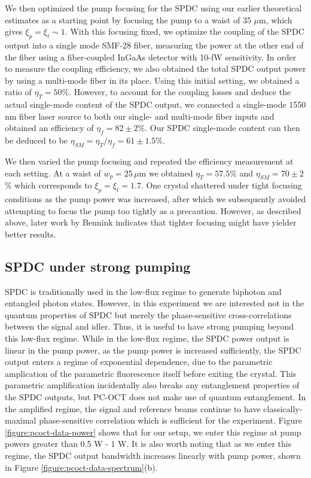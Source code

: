 We then optimized the pump focusing for the SPDC using our earlier theoretical estimates as a starting point by focusing the pump to a waist of 35 $\mu$m, which gives $\xi_p = \xi_t \sim 1$. With this focusing fixed, we optimize the coupling of the SPDC output into a single mode SMF-28 fiber, measuring the power at the other end of the fiber using a fiber-coupled InGaAs detector with 10-fW sensitivity. In order to measure the coupling efficiency, we also obtained the total SPDC output power by using a multi-mode fiber in its place. Using this initial setting, we obtained a ratio of $\eta_T = 50$\%. However, to account for the coupling losses and deduce the actual single-mode content of the SPDC output, we connected a single-mode 1550 nm fiber laser source to both our single- and multi-mode fiber inputs and obtained an efficiency of $\eta_{f} = 82 \pm 2$\%. Our SPDC single-mode content can then be deduced to be $\eta_{SM} = \eta_{T}/\eta_{f} = 61 \pm 1.5$\%.

We then varied the pump focusing and repeated the efficiency measurement at each setting. At a waist of $w_p = 25\,\mu$m we obtained $\eta_T = 57.5$\% and $\eta_{SM} = 70 \pm 2$\% which corresponds to $\xi_p = \xi_t = 1.7$. One crystal shattered under tight focusing conditions as the pump power was increased, after which we subsequently avoided attempting to focus the pump too tightly as a precaution. However, as described above, later work by Bennink \cite{bennink-optimal} indicates that tighter focusing might have yielder better results.

\subsection{SPDC under strong pumping}

SPDC is traditionally used in the low-flux regime to generate biphoton and entangled photon states. However, in this experiment we are interested not in the quantum properties of SPDC but merely the phase-sensitive cross-correlations between the signal and idler. Thus, it is useful to have strong pumping beyond this low-flux regime. While in the low-flux regime, the SPDC power output is linear in the pump power, as the pump power is increased sufficiently, the SPDC output enters a regime of exponential dependence, due to the parametric amplication of the parametric fluorescence itself before exiting the crystal. This parametric amplification incidentally also breaks any entanglement properties of the SPDC outputs, but  PC-OCT does not make use of quantum entanglement. In the amplified regime, the signal and reference beams continue to have classically-maximal phase-sensitive correlation which is sufficient for the experiment. Figure \ref{figure:pcoct-data-power} shows that for our setup, we enter this regime at pump powers greater than 0.5 W - 1 W. It is also worth noting that as we enter this regime, the SPDC output bandwidth increases linearly with pump power, shown in Figure \ref{figure:pcoct-data-spectrum}(b).



